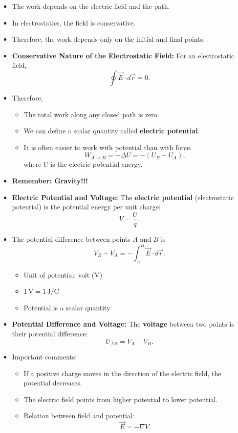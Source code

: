 \documentclass[t,aspectratio=169]{beamer}
\begin{document}
\begin{frame}
\begin{itemize}
\begin{columns}
\begin{column}{0.6\linewidth}
\end{column}
\end{columns}
\item The work depends on the electric field and the path.
\item In electrostatics, the field is conservative.
\item Therefore, the work depends only on the initial and final points.

\pagebreak
\item \textbf{Conservative Nature of the Electrostatic Field:} For an electrostatic field,
$$ \oint \vec{E}\cdot d\vec{r} = 0.$$

\item Therefore,
\begin{itemize}
\item The total work along any closed path is zero.
\item We can define a scalar quantity called \textbf{electric potential}.
\item It is often easier to work with potential than with force.
$$ W_{A \to B} = -\Delta U = -(U_B-U_A), $$ where $U$ is the electric potential energy.
\end{itemize}

\item \textbf{Remember: Gravity!!!}

\pagebreak
\item \textbf{Electric Potential and Voltage:} The \textbf{electric potential} (electrostatic potential) is the potential energy per unit charge:
$$ V = \frac{U}{q}. $$
\item The potential difference between points $A$ and $B$ is
$$ V_B - V_A = -\int_A^B \vec{E}\cdot d\vec{r}. $$

\begin{itemize}
\item Unit of potential: volt (V)
\item $1\,\text{V} = 1\,\text{J/C}$
\item Potential is a scalar quantity
\end{itemize}

\pagebreak
\item \textbf{Potential Difference and Voltage:} The \textbf{voltage} between two points is their potential difference:
$$ U_{AB} = V_A - V_B. $$

\item Important comments:
\begin{itemize}
\item If a positive charge moves in the direction of the electric field, the potential decreases.
\item The electric field points from higher potential to lower potential.
\item Relation between field and potential:
$$\vec{E} = -\nabla V. $$
\end{itemize}


\end{itemize}
\end{frame}
\end{document}
